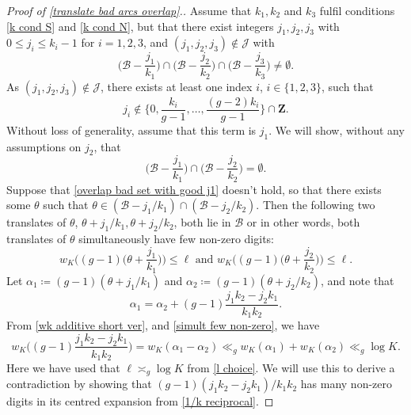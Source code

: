 \documentclass[hidelinks,11pt,reqno]{amsart}
\renewcommand{\leq}{\leqslant}
\newcommand{\Z}{\ensuremath{\mathbf{Z}}}
\newcommand{\fewnz}{\mathcal{B}}
\theoremstyle{remark}
\begin{document}
\begin{proof}[Proof of \cref{translate bad arcs overlap}.] 
     Assume that $k_{1},k_{2}$ and $k_{3}$ fulfil conditions \cref{k cond S} and \cref{k cond N}, but that there exist integers $j_{1},j_{2},j_{3}$ with $0\leq j_{i}\leq k_{i}-1$ for $i=1,2,3$, and $(j_{1},j_{2},j_{3})\notin \mathcal{J}$ with
     \begin{equation}\label{overlap bad set exists}
         \Big (\fewnz -\frac{j_{1}}{k_{1}}\Big )\cap \Big (\fewnz -\frac{j_{2}}{k_{2}}\Big )\cap \Big (\fewnz -\frac{j_{3}}{k_{3}}\Big )\neq \emptyset.
     \end{equation}
     As $(j_{1},j_{2},j_{3})\notin \mathcal{J}$, there exists at least one index $i$, $i\in\{1,2,3\}$, such that
     \begin{equation}\label{j assumption}j_{i}\notin \Big \{0,\frac{k_{i}}{g-1},\ldots, \frac{(g-2)k_{i}}{g-1}\Big\}\cap \Z.\end{equation}
     Without loss of generality, assume that this term is $j_{1}$. We will show, without any assumptions on $j_{2}$, that
     \begin{equation}\label{overlap bad set with good j1}
         \Big (\fewnz-\frac{j_{1}}{k_{1}}\Big )\cap \Big (\fewnz -\frac{j_{2}}{k_{2}}\Big )=\emptyset.
     \end{equation}
     Suppose that \cref{overlap bad set with good j1} doesn't hold, so that there exists some $\theta$ such that $\theta\in (\fewnz -j_{1}/k_{1})\cap  (\fewnz -j_{2}/k_{2} )$. Then the following two translates of $\theta$, $\theta+j_{1}/k_{1},\theta+j_{2}/k_{2}$, both lie in $\mathcal{B}$ or in other words, both translates of $\theta$ simultaneously have few non-zero digits:
     \begin{equation}\label{simult few non-zero}
         w_{K}\Big ((g-1)\Big (\theta+\frac{j_{1}}{k_{1}}\Big )\Big)\leq \ell \textrm{ and } w_{K}\Big ((g-1)\Big (\theta+\frac{j_{2}}{k_{2}}\Big )\Big)\leq \ell.
     \end{equation}
Let $\alpha_{1}\coloneq (g-1)(\theta+j_{1}/k_{1})$ and $\alpha_{2}\coloneq (g-1)(\theta+j_{2}/k_{2})$, and note that 
\begin{equation}\label{alpha fraction}\alpha_{1}=\alpha_{2}+(g-1)\frac{j_{1}k_{2}-j_{2}k_{1}}{k_{1}k_{2}}.\end{equation}
From \cref{wk additive short ver}, and \cref{simult few non-zero}, we have
\begin{equation}\label{rational few nonzero}
    w_{K}\Big ((g-1)\frac{j_{1}k_{2}-j_{2}k_{1}}{k_{1}k_{2}}\Big )=w_{K}(\alpha_{1}-\alpha_{2})\ll_{g} w_{K}(\alpha_{1})+w_{K}(\alpha_{2})\ll_{g} \log K.
\end{equation}
Here we have used that $\ell \asymp_{g} \log K$ from \cref{l choice}. We will use this to derive a contradiction by showing that $(g-1)(j_{1}k_{2}-j_{2}k_{1})/k_{1}k_{2}$ has many non-zero digits in its centred expansion from \cref{1/k reciprocal}.


\end{proof}
\end{document}
